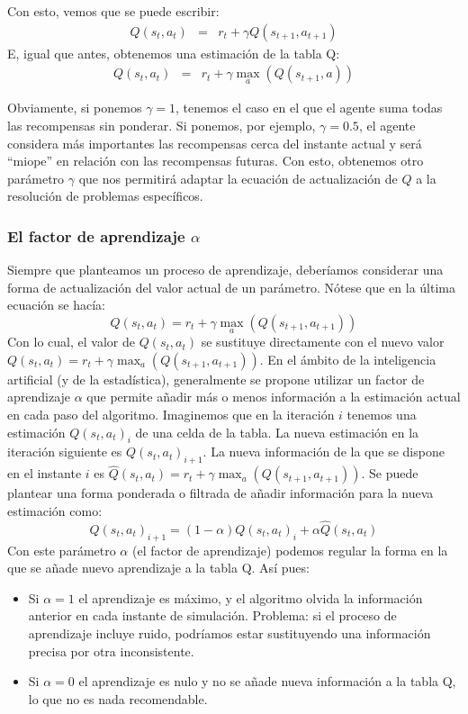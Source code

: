 \documentclass{article}
\begin{document}
Con esto, vemos que se puede escribir:
\begin{eqnarray*}
Q(s_t,a_t) &=& r_t + \gamma 
Q(s_{t+1},a_{t+1}) 
\end{eqnarray*}
E, igual que antes, obtenemos una estimación de la tabla Q:
\begin{eqnarray*}
Q(s_t,a_t) &=& r_t + \gamma 
\max_a(Q(s_{t+1},a))
\end{eqnarray*}

Obviamente, si ponemos $\gamma=1$, tenemos el caso en el que el agente suma todas las recompensas sin ponderar. Si ponemos, por ejemplo, $\gamma=0.5$, el agente considera más importantes las recompensas cerca del instante actual y será ``miope'' en relación con las recompensas futuras. Con esto, obtenemos otro parámetro $\gamma$ que nos permitirá adaptar la ecuación de actualización de $Q$ a la resolución de problemas específicos.

\subsubsection{El factor de aprendizaje $\alpha$}
Siempre que planteamos un proceso de aprendizaje, deberíamos considerar una forma de actualización del valor actual de un parámetro. Nótese que en la última ecuación se hacía:
\begin{equation*}
Q(s_t,a_t) = r_t + \gamma 
\max_a(Q(s_{t+1},a_{t+1}))
\end{equation*}
Con lo cual, el valor de $Q(s_t,a_t)$ se sustituye directamente con el nuevo valor $Q(s_t,a_t) = r_t + \gamma 
\max_a(Q(s_{t+1},a_{t+1}))$. En el ámbito de la inteligencia artificial (y de la estadística), generalmente se propone utilizar un factor de aprendizaje $\alpha$ que permite añadir más o menos información a la estimación actual en cada paso del algoritmo. Imaginemos que en la iteración $i$ tenemos una estimación $Q(s_t,a_t)_i$ de una celda de la tabla. La nueva estimación en la iteración siguiente es $Q(s_t,a_t)_{i+1}$. La nueva información de la que se dispone en el instante $i$ es $\hat{Q}(s_t,a_t) = r_t + \gamma 
\max_a(Q(s_{t+1},a_{t+1}))$. Se puede plantear una forma ponderada o filtrada de añadir información para la nueva estimación como:
\begin{equation}\label{eq:learning_rate}
Q(s_t,a_t)_{i+1} = (1-\alpha) Q(s_t,a_t)_{i} + \alpha \hat{Q}(s_t,a_t)
\end{equation}
Con este parámetro $\alpha$ (el factor de aprendizaje) podemos regular la forma en la que se añade nuevo aprendizaje a la tabla Q. Así pues:
\begin{itemize}
    \item Si $\alpha=1$ el aprendizaje es máximo, y el algoritmo olvida la información anterior en cada instante de simulación. Problema: si el proceso de aprendizaje incluye ruido, podríamos estar sustituyendo una información precisa por otra inconsistente.
    \item Si $\alpha=0$ el aprendizaje es nulo y no se añade nueva información a la tabla Q, lo que no es nada recomendable.
\end{itemize}
\end{document}
